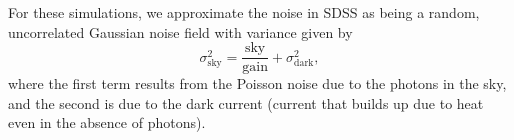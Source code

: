 \documentclass[twocolumn,useAMS,usenatbib]{mn2e}
\newcommand{\beq}{\begin{equation}}
\newcommand{\eeq}{\end{equation}}
\newcommand{\newtext}{}
\begin{document}
For these simulations, we approximate the noise in SDSS as being a
random, \newtext{uncorrelated} Gaussian noise field with variance given by 
\beq\label{E:skyvar}
\sigma_\mathrm{sky}^2 = \frac{\mathrm{sky}}{\mathrm{gain}} +
\sigma_\mathrm{dark}^2, 
\eeq 
where the first term results from the
Poisson noise due to the photons in the sky, and the second is due to
the dark current (current that builds up due to heat even in the
absence of photons).  %
\end{document}
